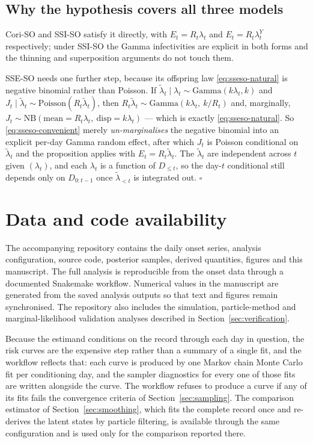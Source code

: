 \documentclass[11pt,a4paper]{article}
\theoremstyle{plain}
\theoremstyle{definition}
\newcommand{\NB}{\mathrm{NB}}
\newcommand{\Pois}{\mathrm{Poisson}}
\newcommand{\Gam}{\mathrm{Gamma}}
\newcommand{\sseso}{SSE-SO}
\newcommand{\ssiso}{SSI-SO}
\newcommand{\coriso}{Cori-SO}
\begin{document}
\subsection*{Why the hypothesis covers all three models}

\coriso{} and \ssiso{} satisfy it directly, with $E_t = R_t\lambda_t$ and
$E_t = R_t\lambda^{Y}_t$ respectively; under \ssiso{} the Gamma infectivities are explicit in
both forms and the thinning and superposition arguments do not touch them.

\sseso{} needs one further step, because its offspring law \eqref{eq:sseso-natural} is negative
binomial rather than Poisson. If $\tilde\lambda_t \mid \lambda_t \sim \Gam(k\lambda_t,k)$ and
$J_t\mid\tilde\lambda_t\sim\Pois(R_t\tilde\lambda_t)$, then
$R_t\tilde\lambda_t\sim\Gam(k\lambda_t,\ k/R_t)$ and, marginally,
$J_t\sim\NB(\text{mean}=R_t\lambda_t,\ \text{disp}=k\lambda_t)$ --- which is exactly
\eqref{eq:sseso-natural}. So \eqref{eq:sseso-convenient} merely \emph{un-marginalises} the
negative binomial into an explicit per-day Gamma random effect, after which $J_t$ is Poisson
conditional on $\tilde\lambda_t$ and the proposition applies with $E_t = R_t\tilde\lambda_t$. The
$\tilde\lambda_t$ are independent across $t$ given $(\lambda_t)$, and each $\lambda_t$ is a
function of $D_{\le t}$, so the day-$t$ conditional still depends only on $D_{0:t-1}$ once
$\tilde\lambda_{<t}$ is integrated out. \hfill$\square$

\section{Data and code availability}
\label{app:reproducibility}

The accompanying repository contains the daily onset series, analysis configuration, source code,
posterior samples, derived quantities, figures and this manuscript. The full analysis is
reproducible from the onset data through a documented Snakemake workflow. Numerical values in the
manuscript are generated from the saved analysis outputs so that text and figures remain
synchronised. The repository also includes the simulation, particle-method and
marginal-likelihood validation analyses described in Section~\ref{sec:verification}.

Because the estimand conditions on the record through each day in question, the risk curves are
the expensive step rather than a summary of a single fit, and the workflow reflects that: each
curve is produced by one Markov chain Monte Carlo fit per conditioning day, and the sampler
diagnostics for every one of those fits are written alongside the curve. The workflow refuses to
produce a curve if any of its fits fails the convergence criteria of
Section~\ref{sec:sampling}. The comparison estimator of Section~\ref{sec:smoothing}, which fits
the complete record once and re-derives the latent states by particle filtering, is available
through the same configuration and is used only for the comparison reported there.
\end{document}
